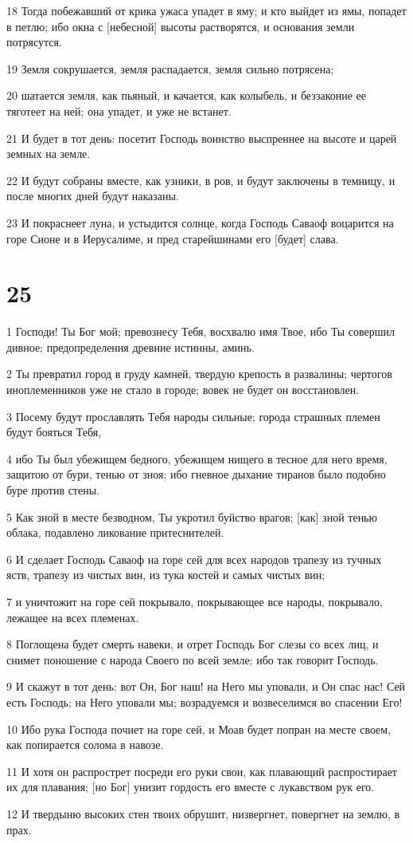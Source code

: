 \par 18 Тогда побежавший от крика ужаса упадет в яму; и кто выйдет из ямы, попадет в петлю; ибо окна с [небесной] высоты растворятся, и основания земли потрясутся.
\par 19 Земля сокрушается, земля распадается, земля сильно потрясена;
\par 20 шатается земля, как пьяный, и качается, как колыбель, и беззаконие ее тяготеет на ней; она упадет, и уже не встанет.
\par 21 И будет в тот день: посетит Господь воинство выспреннее на высоте и царей земных на земле.
\par 22 И будут собраны вместе, как узники, в ров, и будут заключены в темницу, и после многих дней будут наказаны.
\par 23 И покраснеет луна, и устыдится солнце, когда Господь Саваоф воцарится на горе Сионе и в Иерусалиме, и пред старейшинами его [будет] слава.

\chapter{25}

\par 1 Господи! Ты Бог мой; превознесу Тебя, восхвалю имя Твое, ибо Ты совершил дивное; предопределения древние истинны, аминь.
\par 2 Ты превратил город в груду камней, твердую крепость в развалины; чертогов иноплеменников уже не стало в городе; вовек не будет он восстановлен.
\par 3 Посему будут прославлять Тебя народы сильные; города страшных племен будут бояться Тебя,
\par 4 ибо Ты был убежищем бедного, убежищем нищего в тесное для него время, защитою от бури, тенью от зноя; ибо гневное дыхание тиранов было подобно буре против стены.
\par 5 Как зной в месте безводном, Ты укротил буйство врагов; [как] зной тенью облака, подавлено ликование притеснителей.
\par 6 И сделает Господь Саваоф на горе сей для всех народов трапезу из тучных яств, трапезу из чистых вин, из тука костей и самых чистых вин;
\par 7 и уничтожит на горе сей покрывало, покрывающее все народы, покрывало, лежащее на всех племенах.
\par 8 Поглощена будет смерть навеки, и отрет Господь Бог слезы со всех лиц, и снимет поношение с народа Своего по всей земле; ибо так говорит Господь.
\par 9 И скажут в тот день: вот Он, Бог наш! на Него мы уповали, и Он спас нас! Сей есть Господь; на Него уповали мы; возрадуемся и возвеселимся во спасении Его!
\par 10 Ибо рука Господа почиет на горе сей, и Моав будет попран на месте своем, как попирается солома в навозе.
\par 11 И хотя он распрострет посреди его руки свои, как плавающий распростирает их для плавания; [но Бог] унизит гордость его вместе с лукавством рук его.
\par 12 И твердыню высоких стен твоих обрушит, низвергнет, повергнет на землю, в прах.

